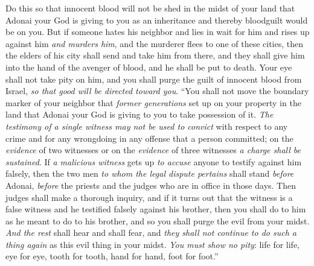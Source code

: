 \begin{biblechapter}
\verse Do this so that innocent blood will not be shed in the midst of your land that Adonai your God is giving to you as an inheritance and thereby bloodguilt would be on you.
\verse But if someone hates his neighbor and lies in wait for him and rises up against him \textit{and murders him}, and the murderer flees to one of these cities,
\verse then the elders of his city shall send and take him from there, and they shall give him into the hand of the avenger of blood, and he shall be put to death.
\verse Your eye shall not take pity on him, and you shall purge the guilt of innocent blood from Israel, \textit{so that good will be directed toward you}.
\verse “You shall not move the boundary marker of your neighbor that \textit{former generations} set up on your property in the land that Adonai your God is giving to you to take possession of it.
\verse \textit{The testimony of a single witness may not be used to convict} with respect to any crime and for any wrongdoing in any offense that a person committed; on the \textit{evidence} of two witnesses or on the \textit{evidence} of three witnesses \textit{a charge shall be sustained}.
\verse If \textit{a malicious witness} gets up \textit{to accuse} anyone to testify against him falsely,
\verse then the two men \textit{to whom the legal dispute pertains} shall stand \textit{before} Adonai, \textit{before} the priests and the judges who are in office in those days.
\verse Then judges shall make a thorough inquiry, and if it turns out that the witness is a false witness and he testified falsely against his brother,
\verse then you shall do to him as he meant to do to his brother, and so you shall purge the evil from your midst.
\verse \textit{And the rest} shall hear and shall fear, and \textit{they shall not continue to do such a thing again} as this evil thing in your midst.
\verse \textit{You must show no pity}: life for life, eye for eye, tooth for tooth, hand for hand, foot for foot.”
\end{biblechapter}


